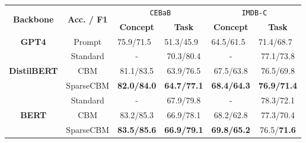 \documentclass[letterpaper]{article} %
\begin{document}
\begin{table}[t]
\centering
\setlength{\tabcolsep}{1pt} %
\fontsize{9pt}{9.5pt}\selectfont
\begin{tabular}{cccccc}
\toprule
\multirow{2}{*}{\textbf{Backbone}}   & \multirow{2}{*}{\textbf{Acc. / F1}} & \multicolumn{2}{c}{\texttt{CEBaB}}                                & \multicolumn{2}{c}{\texttt{IMDB-C}}                                 \\ \cline{3-6} 
                                     &                                     & \textbf{Concept}                & \textbf{Task}                   & \textbf{Concept}                & \textbf{Task}                   \\ \midrule
\textbf{GPT4}                        & Prompt                           & \multicolumn{1}{l}{75.9/71.5} & \multicolumn{1}{l}{51.3/45.9} & \multicolumn{1}{l}{64.5/61.5} & \multicolumn{1}{l}{71.4/68.7} \\ \midrule
\multirow{3}{*}{\textbf{DistilBERT}} & Standard                            & -                               & 70.3/80.4                     & -                               &     77.1/73.8                           \\
                                     & CBM                                 & 81.1/83.5                     &  63.9/76.5                     &        67.5/63.8                         & 76.5/69.8                                \\
                                     & SparseCBM                           & \textbf{82.0/84.0}            & \textbf{64.7/77.1}            &     \textbf{68.4/64.3}                            &    \textbf{76.9/71.4}                             \\ \midrule
\multirow{3}{*}{\textbf{BERT}}       & Standard                            & -                               & 67.9/79.8                     & -                               &  78.3/72.1                               \\
                                     & CBM                                 & 83.2/85.3                     & 66.9/78.1                     &   68.2/62.8                              &    77.3/70.4                             \\
                                     & SparseCBM                           & \textbf{83.5/85.6}            & \textbf{66.9/79.1}            &    \textbf{69.8/65.2}                             &    76.5/\textbf{71.6}                             \\ \midrule

\end{tabular}
\end{table}
\end{document}
